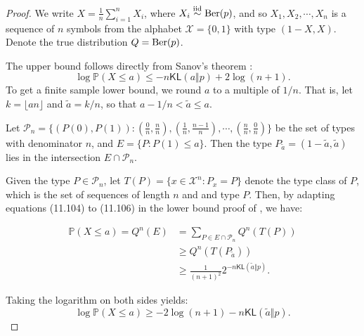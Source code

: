 \documentclass[12pt]{article}
\newcommand{\KL}{\textsf{KL}}
\begin{document}
\begin{proof}
    We write $X = \frac{1}{n}\sum_{i = 1}^n X_i$, where $X_i \overset{\mathrm{iid}}{\sim} \textnormal{Ber}(p)$, and so $X_1, X_2, \cdots, X_n$ is a sequence of $n$ symbols from the alphabet $\mathcal{X} = \{0,1\}$ with type $(1-X,X)$. Denote the true distribution $Q=\textnormal{Ber}(p)$. 
    
    The upper bound follows directly from Sanov's theorem \citep{TC}:
    \begin{equation}\label{eqn1}
        \log \mathbb{P}(X \leq a) \leq -n \KL(a\Vert p) + 2\log(n+1).
    \end{equation}
    To get a finite sample lower bound, we round $a$ to a multiple of $1/n$.  That is, let $k=\lfloor a n \rfloor$ and $\tilde{a}=k/n$, so that $a-1/n < \tilde{a} \leq a$.
    
    Let $\mathcal{P}_n = \{(P(0), P(1)): (\frac{0}{n}, \frac{n}{n}),(\frac{1}{n}, \frac{n-1}{n}), \cdots, (\frac{n}{n}, \frac{0}{n}) \}$ be the set of types with denominator $n$, and $E = \{P: P(1) \leq a\}$. Then the type $P_{\tilde{a}} = (1-\tilde{a}, \tilde{a})$ lies in the intersection $E \cap \mathcal{P}_n$.

   Given the type $P \in \mathcal{P}_n$, let $T(P) = \{x \in \mathcal{X}^n: P_x = P\}$ denote the type class of $P$, which is the set of sequences of length $n$ and and type $P$. Then, by adapting equations (11.104) to (11.106) in the lower bound proof of \cite{TC}, we have:
    
    \begin{equation*}
         \begin{split}
        \mathbb{P}(X \leq a) = Q^n(E) &= \sum_{P \in E \cap \mathcal{P}_n} Q^n\left( T \left( P \right) \right)\\
        &\geq Q^n \left(T\left(P_{\tilde{a}}\right)\right)\\
        &\geq \frac{1}{(n+1)^2} 2^{-n\KL(\tilde{a}\Vert p)}.
    \end{split}
    \end{equation*}

    Taking the logarithm on both sides yields:
    \begin{equation}
     \log \mathbb{P}(X \leq a) \geq -2\log(n+1) - n\KL(\tilde{a}\Vert p). \tag{*} \label{*}
    \end{equation}
     

\end{proof}
\end{document}

